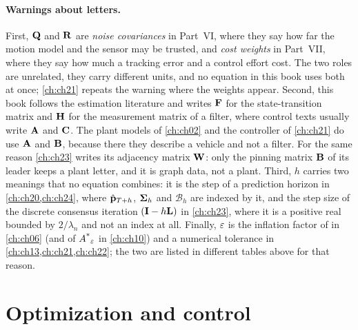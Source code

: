 \paragraph{Warnings about letters.}
First, $\mathbf{Q}$ and $\mathbf{R}$ are \emph{noise covariances} in Part~VI, where they say
how far the motion model and the sensor may be trusted, and \emph{cost weights}
in Part~VII, where they say how much a tracking error and a control effort
cost. The two roles are unrelated, they carry different units, and no equation
in this book uses both at once; \cref{ch:ch21} repeats the warning where the
weights appear. Second, this book follows the estimation literature and writes
$\mathbf{F}$ for the state-transition matrix and $\mathbf{H}$ for the measurement
matrix of a filter, where control texts usually write $\mathbf{A}$ and $\mathbf{C}$.
The plant models of \cref{ch:ch02} and the controller of \cref{ch:ch21} do use
$\mathbf{A}$ and $\mathbf{B}$, because there they describe a vehicle and not a filter.
For the same reason \cref{ch:ch23} writes its adjacency matrix $\mathbf{W}$: only
the pinning matrix $\mathbf{B}$ of its leader keeps a plant letter, and it is
graph data, not a plant. Third, $h$ carries two meanings that no equation
combines: it is the step of a prediction horizon in \cref{ch:ch20,ch:ch24},
where $\hat{\mathbf{p}}_{T+h}$, $\mathbf{\Sigma}_h$ and $\mathcal{B}_h$ are indexed by
it, and the step size of the discrete consensus iteration
$(\mathbf{I}-h\mathbf{L})$ in \cref{ch:ch23}, where it is a positive real bounded by
$2/\lambda_n$ and not an index at all. Finally, $\varepsilon$ is the inflation factor
of \arastar in \cref{ch:ch06} (and of $A\textsuperscript{*}_\varepsilon$ in \cref{ch:ch10}) and a
numerical tolerance in \cref{ch:ch13,ch:ch21,ch:ch22}; the two are listed in
different tables above for that reason.

\section*{Optimization and control}


